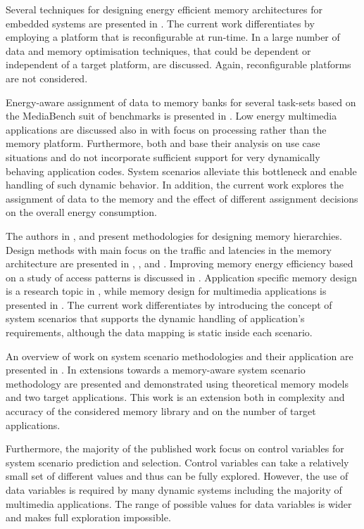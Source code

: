 Several techniques for designing energy efficient memory architectures for embedded systems are presented in \cite{Mac02}. 
The current work differentiates by employing a platform that is reconfigurable at run-time. 
In \cite{Pgk01} a large number of data and memory optimisation techniques, that could be dependent or independent of a target platform, are discussed. 
Again, reconfigurable platforms are not considered.

Energy-aware assignment of data to memory banks for several task-sets based on the MediaBench suit of benchmarks is presented in \cite{Mar03}. 
Low energy multimedia applications are discussed also in \cite{Chu02} with focus on processing rather than the memory platform. 
Furthermore, both \cite{Mar03} and \cite{Chu02} base their analysis on use case situations and do not incorporate sufficient support for very dynamically behaving application codes. 
System scenarios alleviate this bottleneck and enable handling of such dynamic behavior. 
In addition, the current work explores the assignment of data to the memory and the effect of different assignment decisions on the overall energy consumption.

The authors in \cite{abraham1999automatic}, \cite{jacob1996analytical} and \cite{li1999hardware} present methodologies for designing memory hierarchies.
Design methods with main focus on the traffic and latencies in the memory architecture are presented in \cite{chen1999loop}, \cite{grun2000mist}, \cite{jantsch1994hardware} and \cite{passes1995multi}.
Improving memory energy efficiency based on a study of access patterns is discussed in \cite{kandemir2001improving}.
Application specific memory design is a research topic in \cite{schmit1997synthesis}, while memory design for multimedia applications is presented in \cite{oshima1997high}.
The current work differentiates by introducing the concept of system scenarios that supports the dynamic handling of application's requirements, although the data mapping is static inside each scenario. 

An overview of work on system scenario methodologies and their application are presented in \cite{Gheorghita2007}. 
In \cite{Fil12} extensions towards a memory-aware system scenario methodology are presented and demonstrated using theoretical memory models and two target applications. 
This work is an extension both in complexity and accuracy of the considered memory library and on the number of target applications. 

Furthermore, the majority of the published work focus on control variables for system scenario prediction and selection. 
Control variables can take a relatively small set of different values and thus can be fully explored. However, the use of data variables \cite{Elena2010} is required by many dynamic systems including the majority of multimedia applications. 
The range of possible values for data variables is wider and makes full exploration impossible. 

